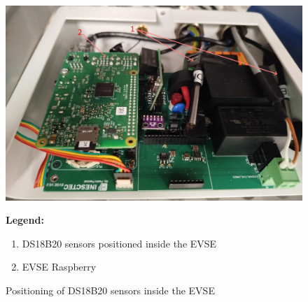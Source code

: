 \begin{figure}[H]
    \centering
    \begin{minipage}{0.6\textwidth}
        \includegraphics[width=\linewidth]{figures/inst_inside_2.png}
    \end{minipage}%
    \hfill
    \begin{minipage}{0.35\textwidth}
        \small
        \textbf{Legend:}
        \begin{enumerate}
            \item DS18B20 sensors positioned inside the EVSE
            \item EVSE Raspberry
        \end{enumerate}
    \end{minipage}
    \caption{Positioning of DS18B20 sensors inside the EVSE}
    \label{fig:inst_inside_2}
\end{figure}

